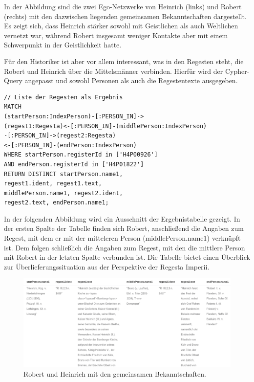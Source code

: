 \documentclass[ngerman,]{scrreprt}
\begin{document}
In der Abbildung sind die zwei Ego-Netzwerke von Heinrich (links) und Robert (rechts) mit den dazwischen liegenden gemeinsamen Bekanntschaften dargestellt. Es zeigt sich, dass Heinrich stärker sowohl mit Geistlichen als auch Weltlichen vernetzt war, während Robert insgesamt weniger Kontakte aber mit einem Schwerpunkt in der Geistlichkeit hatte.

Für den Historiker ist aber vor allem interessant, was in den Regesten steht, die Robert und Heinrich über die Mittelsmänner verbinden. Hierfür wird der Cypher-Query angepasst und sowohl Personen als auch die Regestentexte ausgegeben.

\begin{verbatim}
// Liste der Regesten als Ergebnis
MATCH
(startPerson:IndexPerson)-[:PERSON_IN]->
(regest1:Regesta)<-[:PERSON_IN]-(middlePerson:IndexPerson)
-[:PERSON_IN]->(regest2:Regesta)
<-[:PERSON_IN]-(endPerson:IndexPerson)
WHERE startPerson.registerId in ['H4P00926']
AND endPerson.registerId in ['H4P01822']
RETURN DISTINCT startPerson.name1,
regest1.ident, regest1.text,
middlePerson.name1, regest2.ident,
regest2.text, endPerson.name1;
\end{verbatim}

In der folgenden Abbildung wird ein Ausschnitt der Ergebnistabelle gezeigt. In der ersten Spalte der Tabelle finden sich Robert, anschließend die Angaben zum Regest, mit dem er mit der mitteleren Person (middlePerson.name1) verknüpft ist. Dem folgen schließlich die Angaben zum Regest, mit den die mittlere Person mit Robert in der letzten Spalte verbunden ist. Die Tabelle bietet einen Überblick zur Überlieferungssituation aus der Perspektive der Regesta Imperii.

\begin{figure}
\centering
\includegraphics{Bilder/RI2Graph/RobertHeinrichApocTabelle.png}
\caption{Robert und Heinrich mit den gemeinsamen Bekanntschaften.}
\end{figure}
\end{document}
